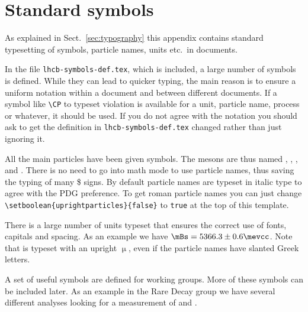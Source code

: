 \section{Standard symbols}

As explained in Sect.~\ref{sec:typography} this appendix contains standard
typesetting of symbols, particle names, units etc.\ in \lhcb
documents. 

In the file \texttt{lhcb-symbols-def.tex}, which is included, a
large number of symbols is defined. While they can lead to quicker
typing, the main reason is to ensure a uniform notation within a
document and between different \lhcb documents. If a symbol
like \texttt{\textbackslash CP} to typeset \CP violation is available
for a unit, particle name, process or whatever, it should be used.  If
you do not agree with the notation you should ask to get the
definition in \texttt{lhcb-symbols-def.tex} changed rather than just
ignoring it.

All the main particles have been given symbols. The \B mesons are thus
named \Bp, \Bd, \Bs, and \Bc. There is no need to go into math mode to
use particle names, thus saving the typing of many \$ signs. By
default particle names are typeset in italic type to agree with the
PDG preference. To get roman particle
names you can just change 
\texttt{\textbackslash setboolean\{uprightparticles\}\{false\}}
to \texttt{true} at the top of this template.

There is a large number of units typeset that ensures the correct use
of fonts, capitals and spacing. As an example we have
$\mBs=5366.3\pm0.6\mevcc$. Note that \mum is typeset with an upright
$\upmu$, even if the particle names have slanted Greek letters.

A set of useful symbols are defined for working groups. More of these
symbols can be included later. As an example in the Rare Decay group
we have several different analyses looking for a measurement of
 and .



